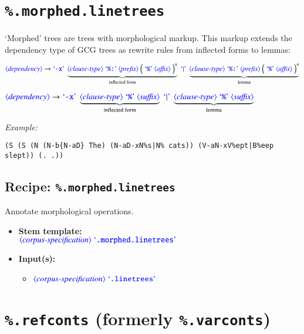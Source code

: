 \documentclass[12pt]{report}
\def\blue{\color{blue}}
\def\magenta{\color{magenta}}
\def\red{\color{red}}
\begin{document}
\section{\blue\tt \%.morphed.linetrees}

`Morphed' trees are trees with morphological markup.
%
This markup extends the dependency type of GCG trees as rewrite rules from inflected forms to lemmas:

$\dtype{dependency} \rightarrow \dcode{-x} \ \underbrace{\dtype{clause-type} \ \dcode{\%:} \ \dtype{prefix} \ \Big( \ \dcode{\%} \ \dtype{affix} \ \Big)^n}_\text{inflected form}
                             \ \dcode{$|$} \ \underbrace{\dtype{clause-type} \ \dcode{\%:} \ \dtype{prefix} \ \Big( \ \dcode{\%} \ \dtype{affix} \ \Big)^n}_\text{lemma}$

$\dtype{dependency} \rightarrow \dcode{-x} \ \underbrace{\dtype{clause-type} \ \dcode{\%} \ \dtype{suffix}}_\text{inflected form}
                             \ \dcode{$|$} \ \underbrace{\dtype{clause-type} \ \dcode{\%} \ \dtype{suffix}}_\text{lemma}$


\textit{Example:}
{\magenta\begin{verbatim}
(S (S (N (N-b{N-aD} The) (N-aD-xN%s|N% cats)) (V-aN-xV%ept|B%eep slept)) (. .))
\end{verbatim}
}

\subsection{Recipe: {\blue\tt \%.morphed.linetrees}}

Annotate morphological operations.

\begin{itemize}
      \item \textbf{Stem template:}\\
      $\dtype{corpus-specification} \ \dcode{.morphed.linetrees}$
      \item \textbf{Input(s):}
      \begin{itemize}
            \item $\dtype{corpus-specification} \ \dcode{.linetrees}$
      \end{itemize}
\end{itemize}


\section{{\blue\tt \%.refconts} (formerly {\red\tt \%.varconts})}
\end{document}
